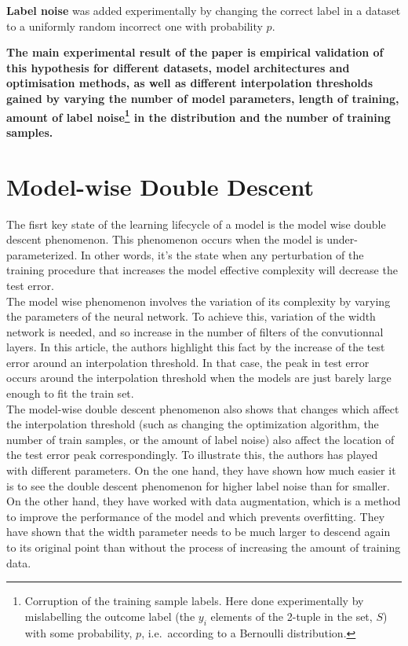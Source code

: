 \documentclass[]{article}
\begin{document}
\textbf{Label noise} was added experimentally by changing the correct
label in a dataset to a uniformly random incorrect one with probability
\(p\).

\textbf{The main experimental result of the paper is empirical
validation of this hypothesis for different datasets, model
architectures and optimisation methods, as well as different
interpolation thresholds gained by varying the number of model
parameters, length of training, amount of label noise\footnote{Corruption
  of the training sample labels. Here done experimentally by
  mislabelling the outcome label (the \(y_i\) elements of the 2-tuple in
  the set, \(S\)) with some probability, \(p\), i.e.~according to a
  Bernoulli distribution.} in the distribution and the number of
training samples.}

\section{Model-wise Double Descent}
The fisrt key state of the learning lifecycle of a model is the model wise double descent phenomenon. This phenomenon occurs when the model is under-parameterized. In other words, it’s the state when any perturbation of the training procedure that increases the model effective complexity will decrease the test error.\\
The model wise phenomenon involves the variation of its complexity by varying the parameters of the neural network. To achieve this, variation of the width network is needed, and so increase in the number of filters of the convutionnal layers. In this article, the authors highlight this fact by the increase of the test error around an interpolation threshold. In that case, the peak in test error occurs around the interpolation threshold when the models are just barely large enough to fit the train set. \\
The model-wise double descent phenomenon also shows that changes which affect the interpolation threshold (such as changing the optimization algorithm, the number of train samples, or the amount of label noise) also affect the location of the test error peak correspondingly. To illustrate this, the authors has played with different parameters. On the one hand, they have shown how much easier it is to see the double descent phenomenon for higher label noise than for smaller. On the other hand, they have worked with data augmentation, which is a method to improve the performance of the model and which prevents overfitting. They have shown that the width parameter needs to be much larger to descend again to its original point than without the process of increasing the amount of training data. 
\end{document}
